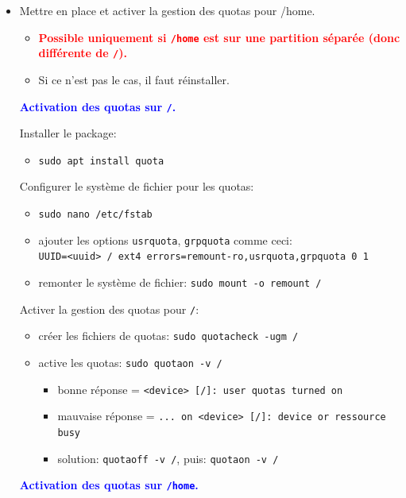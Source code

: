 \documentclass[a4paper]{article}
\begin{document}
\begin{itemize}
\item Mettre en place et activer la gestion des quotas pour /home.
\begin{itemize}
    \item \textcolor{red}{\textbf{Possible uniquement si \texttt{/home} est sur une partition séparée (donc différente de \texttt{/}).}}
    \item Si ce n'est pas le cas, il faut réinstaller.
\end{itemize}
\textcolor{blue}{\textbf{Activation des quotas sur \texttt{/}.}}
\begin{example}
    Installer le package:
    \begin{itemize}
        \item \texttt{sudo apt install quota}
    \end{itemize}
    Configurer le système de fichier pour les quotas:
    \begin{itemize}
        \item \texttt{sudo nano /etc/fstab}
        \item ajouter les options \texttt{usrquota}, \texttt{grpquota} comme ceci: \\
        \texttt{UUID=<uuid> / ext4 errors=remount-ro,usrquota,grpquota 0 1}
        \item remonter le système de fichier: \texttt{sudo mount -o remount /}
    \end{itemize}
    Activer la gestion des quotas pour \texttt{/}:
    \begin{itemize}
        \item créer les fichiers de quotas: \texttt{sudo quotacheck -ugm /}
        \item active les quotas: \texttt{sudo quotaon -v /}
        \begin{example}
            \begin{itemize}
                \item bonne réponse = \texttt{<device> [/]: user quotas turned on}
                \item mauvaise réponse = \texttt{... on <device> [/]: device or ressource busy}
                \item solution: \texttt{quotaoff -v /}, puis: \texttt{quotaon -v /}
            \end{itemize}
        \end{example}
    \end{itemize}
\end{example}
\textcolor{blue}{\textbf{Activation des quotas sur \texttt{/home}.}}

\end{itemize}
\end{document}
